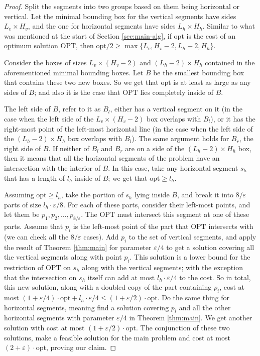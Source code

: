 \documentclass[10pt,a4paper]{amsart}
\theoremstyle{thmstyleone}
\newcommand{\eps}{\varepsilon}
\newcommand{\opt}{{\text{opt}}}
\newcommand{\OPT}{{\text{OPT}}}
\begin{document}
\begin{proof}
    Split the segments into two groups based on them being horizontal or vertical. Let the minimal bounding box for the vertical segments have sides $ L_v\times H_v $, and the one for horizontal segments have sides $ L_h \times H_h $. Similar to what was mentioned at the start of Section \ref{sec:main-alg}, if $ \opt $ is the cost of an optimum solution $ \OPT $, then $ \opt/2 \ge \max\{ L_v, H_v - 2, L_h - 2, H_h \}$.
		
    Consider the boxes of sizes $ L_v\times (H_v - 2) $ and $ (L_h - 2)\times H_h $ contained in the aforementioned minimal bounding boxes. Let $ B $ be the smallest bounding box that contains these two new boxes. So we get that $ \opt $ is at least as large as any sides of $ B $; and also it is the case that $ \OPT $ lies completely inside of $ B $. 
    
    The left side of $ B $, refer to it as $ B_l $, either has a vertical segment on it (in the case when the left side of the $ L_v\times (H_v - 2) $ box overlaps with $ B_l $), or it has the right-most point of the left-most horizontal line (in the case when the left side of the $ (L_h - 2)\times H_h $ box overlaps with $ B_l $). The same argument holds for $ B_r $, the right side of $ B $. If neither of $ B_l $ and $ B_r $ are on a side of the $ (L_h - 2)\times H_h $ box, then it means that all the horizontal segments of the problem have an intersection with the interior of $ B $. In this case, take any horizontal segment $ s_h $ that has a length of $ l_h $ inside of $ B $; we get that $ \opt \ge l_h $.
    
    Assuming $ \opt \ge l_h $, take the portion of $ s_h $ lying inside $ B $, and break it into $ 8/\eps $ parts of size $ l_h\cdot \eps/8 $. For each of these parts, consider their left-most points, and let them be $ p_1, p_2,\dots, p_{8/\eps} $. The $ \OPT $ must intersect this segment at one of these parts. Assume that $ p_i $ is the left-most point of the part that $ \OPT $ intersects with (we can check all the $ 8/\eps $ cases). 
    Add $ p_i $ to the set of vertical segments, and apply the result of Theorem \ref{thm:main} for parameter $ \eps/4 $ to get a solution covering all the vertical segments along with point $ p_i $.
    This solution is a lower bound for the restriction of $ \OPT $ on $ s_h $ along with the vertical segments; with the exception that the intersection on $ s_h $ itself can add at most $ l_h\cdot \eps/4 $ to the cost. So in total, this new solution, along with a doubled copy of the part containing $ p_i $, cost at most $ (1 +\eps/4)\cdot \opt + l_h\cdot\eps/4 \le (1 + \eps/2)\cdot \opt $.
    Do the same thing for horizontal segments, meaning find a solution covering $ p_i $ and all the other horizontal segments with parameter $ \eps/4 $ in Theorem \ref{thm:main}. We get another solution with cost at most $ (1 + \eps/2)\cdot \opt$.
    The conjunction of these two solutions, make a feasible solution for the main problem and cost at most $ (2 + \eps)\cdot \opt $, proving our claim.
    

\end{proof}
\end{document}
